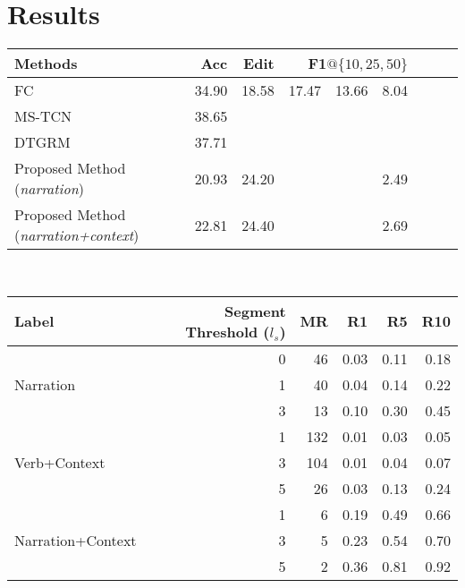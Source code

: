 \documentclass[11pt,a4paper]{article}
\begin{document}
\section{Results}

\begin{table*}[h!]
\begin{minipage}[b]{1\textwidth}
\centering
\begin{tabular}{lrrrrrr}
\toprule
Methods  & Acc & Edit & F1$@\{10,25,50\}$ \\
\midrule
FC  & 34.90 & 18.58 & 17.47~~13.66~~8.04\\
MS-TCN \cite{8953830} & 38.65 & & \\
DTGRM \cite{wang2020temporal} & 37.71 & & \\
\midrule
Proposed Method (\textit{narration}) & 20.93 & 24.20 & 2.49 & \\
Proposed Method (\textit{narration+context})& 22.81 & 24.40 & 2.69 & \\
\bottomrule
\end{tabular}
\caption{Results of baseline models}
\label{table:results}
\end{minipage}
~\\
\begin{minipage}[b]{1\textwidth}
\centering
\begin{tabular}{lrrrrr}
\toprule
Label &  Segment Threshold ($l_s$) & MR & R1 & R5 & R10 \\
\midrule
\multirow{3}{*}{Narration} & 0 & 46 & 0.03 & 0.11 & 0.18 \\
 & 1 & 40 & 0.04 & 0.14 & 0.22 \\
 & 3 & 13 & 0.10 & 0.30 & 0.45 \\
\midrule
 & 1 & 132 & 0.01 & 0.03 & 0.05 \\
Verb+Context & 3 & 104 & 0.01 & 0.04 & 0.07 \\
 & 5 & 26 & 0.03 & 0.13 & 0.24\\
\midrule
 & 1 & 6 & 0.19 & 0.49 & 0.66 \\
Narration+Context & 3 & 5 & 0.23 & 0.54 & 0.70 \\
 & 5 & 2 & 0.36 & 0.81 & 0.92 \\
\bottomrule
\end{tabular}
\caption{Results of Video-Text Retrieval using different segment threshold}
\label{table:howto100m_seg_threshold}

\end{minipage}
\end{table*}
\end{document}
